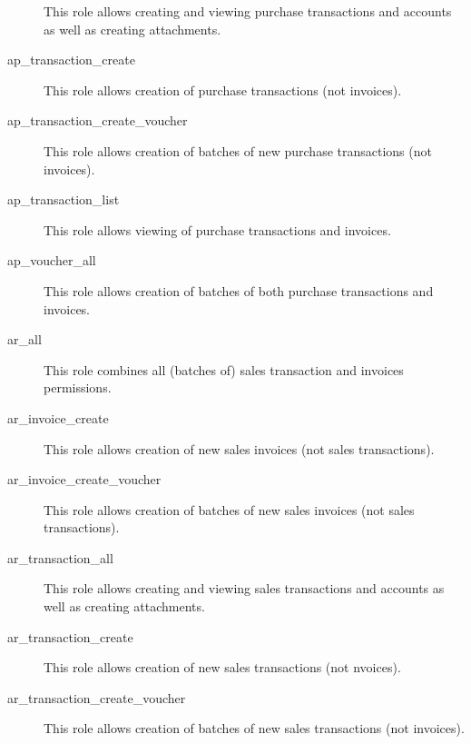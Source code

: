 \begin{description}
                         This role allows creating and viewing purchase transactions and accounts as well as creating attachments.
\item [ap\_transaction\_create] \htmlspacing 
                         This role allows creation of purchase transactions (not invoices).
\item [ap\_transaction\_create\_voucher] \htmlspacing 
                         This role allows creation of batches of new purchase transactions (not invoices).
\item [ap\_transaction\_list] \htmlspacing 
                         This role allows viewing of purchase transactions and invoices.
\item [ap\_voucher\_all] \htmlspacing 
                         This role allows creation of batches of both purchase transactions and invoices.
\item [ar\_all] \htmlspacing 
                         This role combines all (batches of) sales transaction and invoices permissions.
\item [ar\_invoice\_create] \htmlspacing 
                         This role allows creation of new sales invoices (not sales transactions).
\item [ar\_invoice\_create\_voucher] \htmlspacing 
                         This role allows creation of batches of new sales invoices (not sales transactions).
\item [ar\_transaction\_all] \htmlspacing 
                         This role allows creating and viewing sales transactions and accounts as well as creating attachments.
\item [ar\_transaction\_create] \htmlspacing 
                         This role allows creation of new sales transactions (not nvoices).
\item [ar\_transaction\_create\_voucher] \htmlspacing 
                         This role allows creation of batches of new sales transactions (not invoices).

\end{description}

